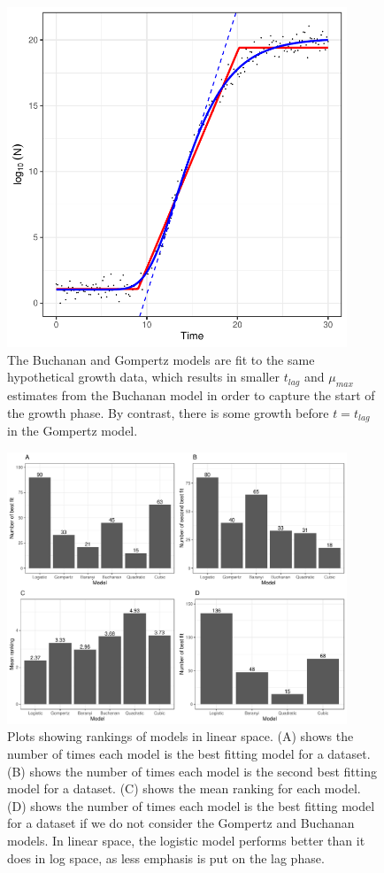 \documentclass[11pt, a4paper]{article}
\begin{document}
         \begin{figure}[H]
        \includegraphics[width=4in]{../results/fit_difference.pdf}
        \centering
        \caption{The Buchanan and Gompertz models are fit to the same hypothetical growth data, which results in smaller $t_{lag}$ and $\mu_{max}$ estimates from the Buchanan model in order to capture the start of the growth phase. By contrast, there is some growth before $t = t_{lag}$ in the Gompertz model.}
        \label{sup:fit_difference}
        \end{figure} 
        
        
                \begin{figure}[H]
        \includegraphics[width=4in]{../results/best_fit_frequency_bar_linear.pdf}
        \centering
        \caption{Plots showing rankings of models in linear space. (A) shows the number of times each model is the best fitting model for a dataset. (B) shows the number of times each model is the second best fitting model for a dataset. (C) shows the mean ranking for each model. (D) shows the number of times each model is the best fitting model for a dataset if we do not consider the Gompertz and Buchanan models.  In linear space, the logistic model performs better than it does in log space, as less emphasis is put on the lag phase.}
        \label{sup:frequency_bar_linear}
        \end{figure} 
        
\end{document}

